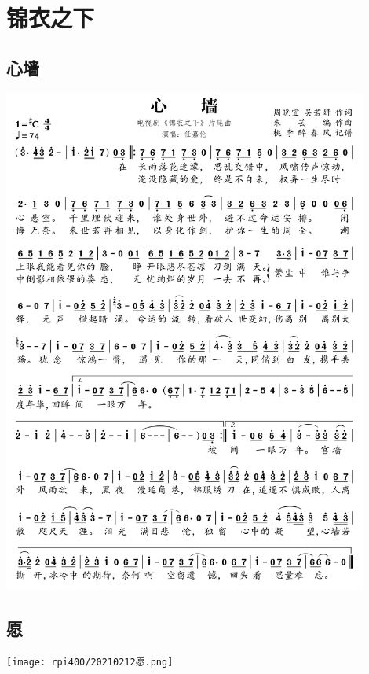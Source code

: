 \documentclass[cn,pad,twocol]{elegantbook}
\begin{document}
\chapter{锦衣之下}
\section{心墙} \includegraphics[width=0.9\textwidth]{rpi400/20210212心墙.png}
\section{愿} \texttt{[image: rpi400/20210212愿.png]}
\end{document}
